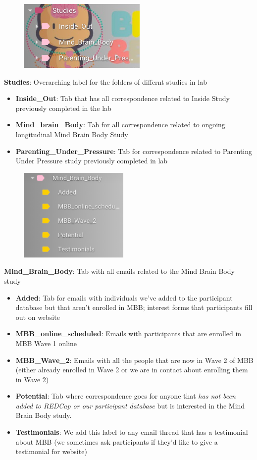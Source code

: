 \documentclass[]{book}
\begin{document}
\begin{figure}
\centering
\includegraphics{images/lab_protocols/gmail/gmail_4.png}
\caption{}
\end{figure}

\textbf{Studies}: Overarching label for the folders of differnt studies in lab

\begin{itemize}
\item
  \textbf{Inside\_Out}: Tab that has all correspondence related to Inside Study previously completed in the lab
\item
  \textbf{Mind\_brain\_Body}: Tab for all correspondence related to ongoing longitudinal Mind Brain Body Study
\item
  \textbf{Parenting\_Under\_Pressure}: Tab for correspondence related to Parenting Under Pressure study previously completed in lab
\end{itemize}

\begin{figure}
\centering
\includegraphics{images/lab_protocols/gmail/gmail_3.png}
\caption{}
\end{figure}

\textbf{Mind\_Brain\_Body}: Tab with all emails related to the Mind Brain Body study

\begin{itemize}
\item
  \textbf{Added}: Tab for emails with individuals we've added to the participant database but that aren't enrolled in MBB; interest forms that participants fill out on website
\item
  \textbf{MBB\_online\_scheduled}: Emails with participants that are enrolled in MBB Wave 1 online
\item
  \textbf{MBB\_Wave\_2}: Emails with all the people that are now in Wave 2 of MBB (either already enrolled in Wave 2 or we are in contact about enrolling them in Wave 2)
\item
  \textbf{Potential}: Tab where correspondence goes for anyone that \emph{has not been added to REDCap or our participant database} but is interested in the Mind Brain Body study.
\item
  \textbf{Testimonials}: We add this label to any email thread that has a testimonial about MBB (we sometimes ask participants if they'd like to give a testimonial for website)
\end{itemize}
\end{document}
